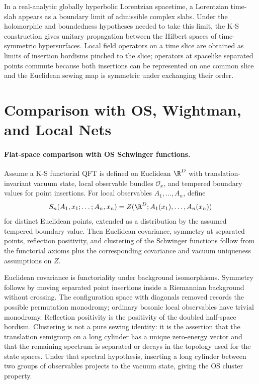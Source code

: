 In a real-analytic globally hyperbolic Lorentzian spacetime, a Lorentzian
time-slab appears as a boundary limit of admissible complex slabs.  Under the
holomorphic and boundedness hypotheses needed to take this limit, the K-S
construction gives unitary propagation between the Hilbert spaces of
time-symmetric hypersurfaces.  Local field operators on a time slice are
obtained as limits of insertion bordisms pinched to the slice; operators at
spacelike separated points commute because both insertions can be represented
on one common slice and the Euclidean sewing map is symmetric under exchanging
their order.

\section{Comparison with OS, Wightman, and Local Nets}

\paragraph{Flat-space comparison with OS Schwinger functions.}
Assume a K-S functorial QFT is defined on Euclidean \(\R^D\) with
translation-invariant vacuum state, local observable bundles
\(\mathcal O_x\), and tempered boundary values for point insertions.  For
local observables \(A_1,\ldots,A_n\), define
\[
  S_n(A_1,x_1;\ldots;A_n,x_n)
  =
  Z(\R^D;A_1(x_1),\ldots,A_n(x_n))
\]
for distinct Euclidean points, extended as a distribution by the assumed
tempered boundary value.  Then Euclidean covariance, symmetry at separated
points, reflection positivity, and clustering of the Schwinger functions
follow from the functorial axioms plus the corresponding covariance and
vacuum uniqueness assumptions on \(Z\).

Euclidean covariance is functoriality under background isomorphisms.
Symmetry follows by moving separated point insertions inside a Riemannian
background without crossing.  The configuration space with diagonals removed
records the possible permutation monodromy; ordinary bosonic local observables
have trivial monodromy.  Reflection positivity is the
positivity of the doubled half-space bordism.  Clustering is not a pure sewing
identity: it is the assertion that the translation semigroup on a long
cylinder has a unique zero-energy vector and that the remaining spectrum is
separated or decays in the topology used for the state spaces.  Under that
spectral hypothesis, inserting a long cylinder between two groups of
observables projects to the vacuum state, giving the OS cluster property.

